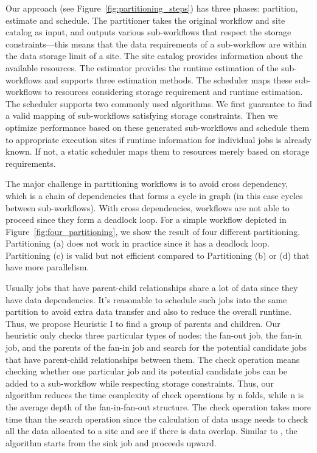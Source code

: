 Our approach (see Figure~\ref{fig:partitioning_steps}) has three phases: partition, estimate and schedule. The partitioner takes the original workflow and site catalog as input, and outputs various sub-workflows that respect the storage constraints—this means that the data requirements of a sub-workflow are within the data storage limit of a site. The site catalog provides information about the available resources. The estimator provides the runtime estimation of the sub-workflows and supports three estimation methods. The scheduler maps these sub-workflows to resources considering storage requirement and runtime estimation. The scheduler supports two commonly used algorithms. We first guarantee to find a valid mapping of sub-workflows satisfying storage constraints. Then we optimize performance based on these generated sub-workflows and schedule them to appropriate execution sites if runtime information for individual jobs is already known. If not, a static scheduler maps them to resources merely based on storage requirements. 

The major challenge in partitioning workflows is to avoid cross dependency, which is a chain of dependencies that forms a cycle in graph (in this case cycles between sub-workflows). With cross dependencies, workflows are not able to proceed since they form a deadlock loop. For a simple workflow depicted in Figure~\ref{fig:four_partitioning}, we show the result of four different partitioning. Partitioning (a) does not work in practice since it has a deadlock loop. Partitioning (c) is valid but not efficient compared to Partitioning (b) or (d) that have more parallelism. 

Usually jobs that have parent-child relationships share a lot of data since they have data dependencies. It’s reasonable to schedule such jobs into the same partition to avoid extra data transfer and also to reduce the overall runtime. Thus, we propose Heuristic I to find a group of parents and children. Our heuristic only checks three particular types of nodes: the fan-out job, the fan-in job, and the parents of the fan-in job and search for the potential candidate jobs that have parent-child relationships between them. The check operation means checking whether one particular job and its potential candidate jobs can be added to a sub-workflow while respecting storage constraints. Thus, our algorithm reduces the time complexity of check operations by n folds, while n is the average depth of the fan-in-fan-out structure. The check operation takes more time than the search operation since the calculation of data usage needs to check all the data allocated to a site and see if there is data overlap. Similar to \cite{Topcuoglu2002}, the algorithm starts from the sink job and proceeds upward. 

